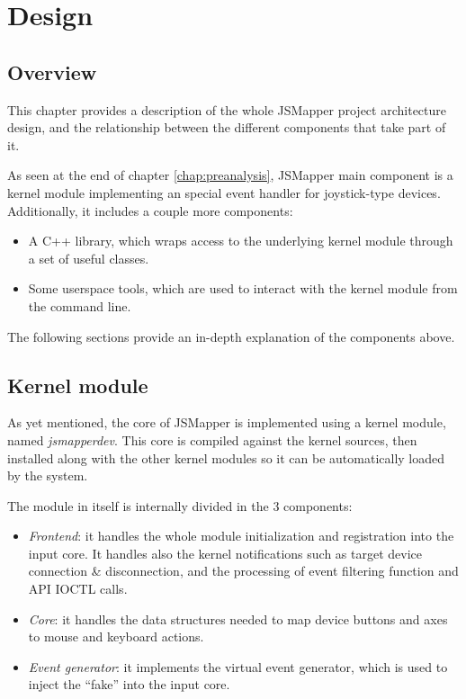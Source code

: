 \chapter{Design}\label{chap:design}
\section{Overview}
This chapter provides a description of the whole JSMapper project architecture design, and the relationship between the different components that take part of it.

As seen at the end of chapter \ref{chap:preanalysis}, JSMapper main component is a kernel module implementing an special event handler for joystick-type devices. Additionally, it includes a couple more components:
\begin{itemize}
	\item A C++ library, which wraps access to the underlying kernel module through a set of useful classes.
	\item Some userspace tools, which are used to interact with the kernel module from the command line.
\end{itemize}

The following sections provide an in-depth explanation of the components above.

\section{Kernel module}
As yet mentioned, the core of JSMapper is implemented using a kernel module, named \emph{jsmapperdev}. This core is compiled against the kernel sources, then installed along with the other kernel modules so it can be automatically loaded by the system.

The module in itself is internally divided in the 3 components:
\begin{itemize}
	\item \emph{Frontend}: it handles the whole module initialization and registration into the input core. It handles also the kernel notifications such as target device connection \& disconnection, and the processing of event filtering function and API IOCTL calls.
	\item \emph{Core}: it handles the data structures needed to map device buttons and axes to mouse and keyboard actions.
	\item \emph{Event generator}: it implements the virtual event generator, which is used to inject the ``fake'' into the input core.
\end{itemize}

